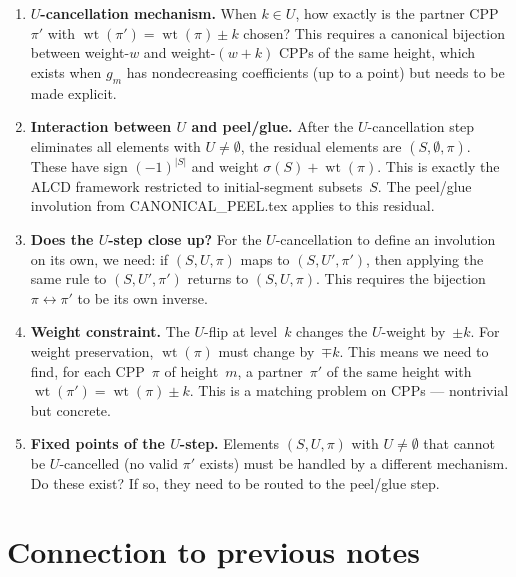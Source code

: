 \documentclass[11pt]{article}
\DeclareMathOperator{\wt}{wt}
\theoremstyle{plain}
\theoremstyle{definition}
\begin{document}
\begin{enumerate}
  \item \textbf{$U$-cancellation mechanism.}
    When $k \in U$, how exactly is the partner
    CPP~$\pi'$ with $\wt(\pi') = \wt(\pi) \pm k$
    chosen?  This requires a canonical bijection
    between weight-$w$ and weight-$(w+k)$ CPPs of the
    same height, which exists when $g_m$ has
    nondecreasing coefficients (up to a point) but
    needs to be made explicit.

  \item \textbf{Interaction between $U$ and peel/glue.}
    After the $U$-cancellation step eliminates all
    elements with $U \neq \emptyset$, the residual
    elements are $(S, \emptyset, \pi)$.  These have
    sign $(-1)^{|S|}$ and weight
    $\sigma(S) + \wt(\pi)$.  This is exactly the ALCD
    framework restricted to initial-segment subsets~$S$.
    The peel/glue involution from
    CANONICAL\_PEEL.tex applies to this residual.

  \item \textbf{Does the $U$-step close up?}
    For the $U$-cancellation to define an involution
    on its own, we need: if $(S, U, \pi)$ maps to
    $(S, U', \pi')$, then applying the same rule to
    $(S, U', \pi')$ returns to $(S, U, \pi)$.  This
    requires the bijection $\pi \leftrightarrow \pi'$
    to be its own inverse.

  \item \textbf{Weight constraint.}
    The $U$-flip at level~$k$ changes the $U$-weight
    by~$\pm k$.  For weight preservation, $\wt(\pi)$
    must change by~$\mp k$.  This means we need to
    find, for each CPP~$\pi$ of height~$m$, a
    partner~$\pi'$ of the same height with
    $\wt(\pi') = \wt(\pi) \pm k$.  This is a matching
    problem on CPPs --- nontrivial but concrete.

  \item \textbf{Fixed points of the $U$-step.}
    Elements $(S, U, \pi)$ with $U \neq \emptyset$ that
    cannot be $U$-cancelled (no valid $\pi'$ exists)
    must be handled by a different mechanism.  Do these
    exist?  If so, they need to be routed to the
    peel/glue step.
\end{enumerate}


\section{Connection to previous notes}
\end{document}

